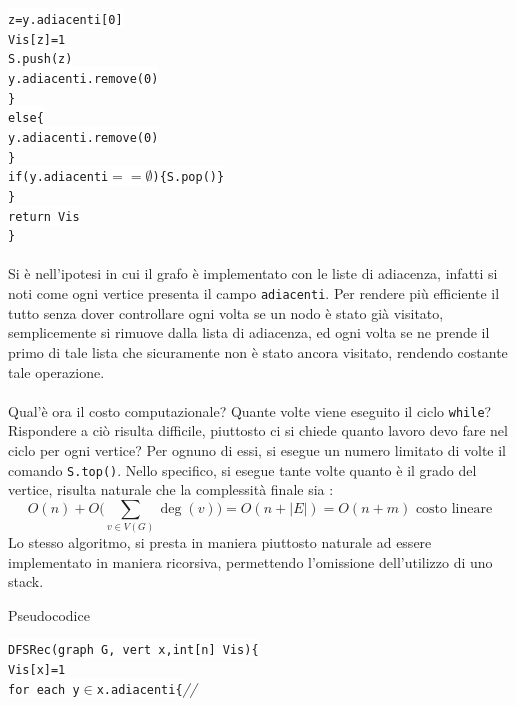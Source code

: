 \documentclass[12pt, letterpaper]{article}
\newcommand{\code}[1]{\colorbox{light-gray}{\texttt{#1}}}
\newcommand{\codee}[1]{\colorbox{white}{\texttt{#1}}}
\newcommand{\acc}{\\\hphantom{}\\}
\newcommand{\comm}[1]{\color{lg}\textit{\hphantom{spaz}// \text{#1}}\color{black}}
\begin{document}
\hphantom{ident}\hphantom{ident}\hphantom{ident}\codee{z=y.adiacenti[0]}\\
\hphantom{ident}\hphantom{ident}\hphantom{ident}\codee{Vis[z]=1}\\
\hphantom{ident}\hphantom{ident}\hphantom{ident}\codee{S.push(z)}\\
\hphantom{ident}\hphantom{ident}\hphantom{ident}\codee{y.adiacenti.remove(0)}\\
\hphantom{ident}\hphantom{ident}\codee{\}}\\
\hphantom{ident}\hphantom{ident}\codee{else\{}\\
\hphantom{ident}\hphantom{ident}\hphantom{ident}\codee{y.adiacenti.remove(0)}\\
\hphantom{ident}\hphantom{ident}\codee{\}}\\
\hphantom{ident}\hphantom{ident}\codee{if(y.adiacenti\(==\emptyset\))\{S.pop()\}}\\
\hphantom{ident}\codee{\}}\\
\hphantom{ident}\codee{return Vis}\\
\codee{\}}\acc 
Si è nell'ipotesi in cui il grafo è implementato con le liste di adiacenza, infatti si noti come ogni vertice 
presenta il campo \code{adiacenti}. Per rendere più efficiente il tutto senza dover controllare ogni volta se un 
nodo è stato già visitato, semplicemente si rimuove dalla lista di adiacenza, ed ogni volta se ne prende il primo 
di tale lista che sicuramente non è stato ancora visitato, rendendo costante tale operazione.\acc 
Qual'è ora il costo computazionale? Quante  volte viene eseguito il ciclo \code{while}? Rispondere a ciò risulta 
difficile, piuttosto ci si chiede quanto lavoro devo fare nel ciclo per ogni vertice? Per ognuno di essi, si 
esegue un numero limitato di volte il comando \code{S.top()}. Nello specifico, si esegue tante volte quanto è il 
grado del vertice, risulta naturale che la complessità finale sia : 
$$O(n)+O\big( \sum_{v\in V(G)}\deg(v)\big)=O(n+|E|)=O(n+m)\text{ costo lineare}$$
Lo stesso algoritmo, si presta in maniera piuttosto naturale ad essere implementato in maniera ricorsiva, 
permettendo l'omissione dell'utilizzo di uno stack.\begin{center}
    Pseudocodice
\end{center} 
\codee{DFSRec(graph G, vert x,int[n] Vis)\{}\\
\hphantom{ident}\codee{Vis[x]=1}\\
\hphantom{ident}\codee{for each y\(\in\)x.adiacenti\{}\comm{per ogni adiacente di x}\\
\end{document}
